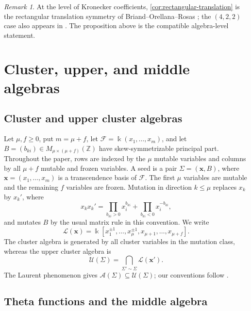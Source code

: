 \documentclass[11pt,reqno]{amsart}
\numberwithin{equation}{section}
\theoremstyle{remark}
\newtheorem{remark}[remark]{Remark}
\newcommand{\kk}{\Bbbk}
\newcommand{\ZZ}{\mathbb{Z}}
\newcommand{\cA}{\mathcal{A}}
\newcommand{\cF}{\mathcal{F}}
\newcommand{\cL}{\mathcal{L}}
\newcommand{\cU}{\mathcal{U}}
\begin{document}
\begin{remark}
At the level of Kronecker coefficients, \cref{cor:rectangular-translation}
is the rectangular translation symmetry of Briand--Orellana--Rosas
\cite[Proposition~7]{BOR}; the $(4,2,2)$ case also appears in
\cite[Corollary~5.1]{Vallejo}.  The proposition above is the compatible
algebra-level statement.
\end{remark}

\section{Cluster, upper, and middle algebras}
\label{sec:cluster-background}

\subsection{Cluster and upper cluster algebras}

Let $\mu,f\ge0$, put $m=\mu+f$, let
$\cF=\kk(x_1,\ldots,x_m)$, and let
$B=(b_{ki})\in M_{\mu\times(\mu+f)}(\ZZ)$ have skew-symmetrizable
principal part.  Throughout the paper, rows are indexed by the $\mu$
mutable variables and columns by all $\mu+f$ mutable and frozen variables.
A seed is a pair $\Sigma=(\mathbf{x},B)$, where
$\mathbf{x}=(x_1,\ldots,x_m)$ is a transcendence basis of $\cF$.  The
first $\mu$ variables are mutable and the remaining $f$ variables are
frozen.  Mutation in direction $k\le\mu$ replaces $x_k$ by $x_k'$, where
\[ x_kx_k' =\prod_{b_{ki}>0}x_i^{b_{ki}} +\prod_{b_{ki}<0}x_i^{-b_{ki}}, \]
and mutates $B$ by the usual matrix rule in this convention.  We write
\[ \cL(\mathbf{x}) =\kk[x_1^{\pm1},\ldots,x_\mu^{\pm1},x_{\mu+1},\ldots,x_{\mu+f}]. \]
The cluster algebra is generated by all cluster variables in the mutation
class, whereas the upper cluster algebra is
\[ \cU(\Sigma)=\bigcap_{\Sigma'\sim\Sigma}\cL(\mathbf{x}'). \]
The Laurent phenomenon gives $\cA(\Sigma)\subseteq\cU(\Sigma)$; our
conventions follow \cite{FZ1,BFZ}.

\subsection{Theta functions and the middle algebra}
\end{document}
